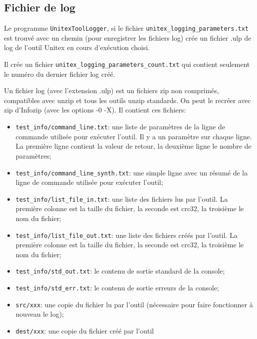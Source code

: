 \subsection{Fichier de log}
 \label{section-log-file}
Le programme \verb+UnitexToolLogger+, si le fichier \verb+unitex_logging_parameters.txt+ 
est trouvé avec un chemin (pour enregistrer les fichiers log) crée un fichier .ulp de log de l'outil 
Unitex en cours d'exécution choisi.

\bigskip

Il crée un fichier \verb+unitex_logging_parameters_count.txt+ qui contient seulement le numéro du
dernier fichier log créé.

Un fichier log (avec l'extension .ulp) est un fichiers zip non comprimés, compatibles avec unzip
et tous les outils unzip standards. On peut le recréer avec zip
d'Infozip (avec les options -0 -X). Il contient ces fichiers:
\begin{itemize}
\item \verb+test_info/command_line.txt+: une liste de paramètres de la ligne de commande utilisée
	pour exécuter l'outil. Il y a un paramètre sur chaque ligne. La première ligne contient la
	valeur de retour, la deuxième ligne le nombre de paramètres;

  \item \verb+test_info/command_line_synth.txt+: une simple ligne avec un résumé de la
ligne de commande utilisée pour exécuter l'outil;

\item \verb+test_info/list_file_in.txt+: une liste des fichiers lus par l'outil.
	La première colonne est la taille du fichier, la seconde est crc32, la troisième le nom du
	fichier;

\item \verb+test_info/list_file_out.txt+: une liste des fichiers créés par l'outil.
  La première colonne est la taille du fichier, la seconde est crc32, la troisième le nom du
  fichier;

  \item \verb+test_info/std_out.txt+: le contenu de sortie standard de la console;

  \item \verb+test_info/std_err.txt+: le contenu de sortie erreurs de la console;

  \item \verb+src/xxx+: une copie du fichier lu par l'outil (nécessaire pour faire fonctionner à
  		  nouveau le log);

  \item \verb+dest/xxx+: une copie du fichier créé par l'outil
\end{itemize}

